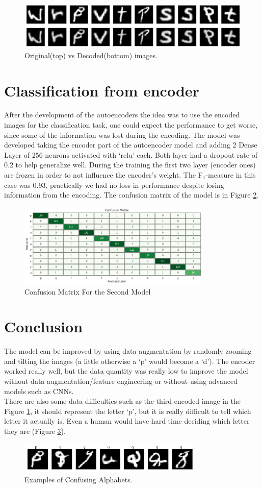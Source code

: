 \documentclass[11pt]{article}
\begin{document}
\begin{figure}[h]
	\centering
	\includegraphics[width=\linewidth]{imgs/autoencoder.png}
	\caption{Original(top) vs Decoded(bottom) images.}
	\label{fig:autoencoder}
\end{figure}

\section*{Classification from encoder}
After the development of the autoencoders the idea was to use the encoded images for the classification task, one could expect the performance to get worse, since some of the information was lost during the encoding. The model was developed taking the encoder part of the autoencoder model and adding 2 Dense Layer of 256 neurons activated with `relu' each. Both layer had a dropout rate of 0.2 to help generalize well. During the training the first two layer (encoder ones) are frozen in order to not influence the encoder's weight. The F$_1$-measure in this case was 0.93, practically we had no loss in performance despite losing information from the encoding. The confusion matrix of the model is in Figure \ref{fig:model2}.
\begin{figure}
	\centering
	\includegraphics[width=\linewidth,height=4cm]{imgs/model_2.png}
	\caption{Confusion Matrix For the Second Model}
	\label{fig:model2}
\end{figure}

\section*{Conclusion}
The model can be improved by using data augmentation by randomly zooming and tilting the images (a little otherwise a `p' would become a `d'). The encoder worked really well, but the data quantity was really low to improve the model without data augmentation/feature engineering or without using advanced models such as CNNs.\\
There are also some data difficulties such as the third encoded image in the Figure \ref{fig:autoencoder}, it should represent the letter `p', but it is really difficult to tell which letter it actually is. Even a human would have hard time deciding which letter they are (Figure \ref{fig:strange}).

\begin{figure}[!b]
	\centering
	\includegraphics[width=\linewidth, height=1.5cm]{imgs/strange_letters.png}
	\caption{Examples of Confusing Alphabets.}
	\label{fig:strange}
\end{figure}
\end{document}
